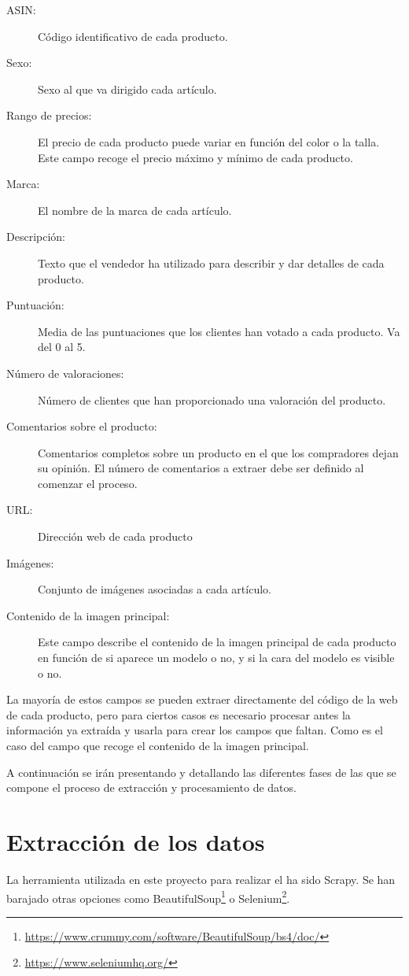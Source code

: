 \begin{description}
    \item[ASIN:] Código identificativo de cada producto.
    \item[Sexo:] Sexo al que va dirigido cada artículo.
    \item[Rango de precios:] El precio de cada producto puede variar en función del color o la talla. Este campo recoge el precio máximo y mínimo de cada producto.
    \item[Marca:] El nombre de la marca de cada artículo.
    \item[Descripción:] Texto que el vendedor ha utilizado para describir y dar detalles de cada producto.
    \item[Puntuación:] Media de las puntuaciones que los clientes han votado a cada producto. Va del 0 al 5.
    \item[Número de valoraciones:] Número de clientes que han proporcionado una valoración del producto.
    \item[Comentarios sobre el producto:] Comentarios completos sobre un producto en el que los compradores dejan su opinión. El número de comentarios a extraer debe ser definido al comenzar el proceso.
    \item[URL:] Dirección web de cada producto
    \item[Imágenes:] Conjunto de imágenes asociadas a cada artículo.
    \item[Contenido de la imagen principal:] Este campo describe el contenido de la imagen principal de cada producto en función de si aparece un modelo o no, y si la cara del modelo es visible o no.
\end{description}

La mayoría de estos campos se pueden extraer directamente del código  de la web de cada producto, pero para ciertos casos es necesario procesar antes la información ya extraída y usarla para crear los campos que faltan. Como es el caso del campo que recoge el contenido de la imagen principal.

A continuación se irán presentando y detallando las diferentes fases de las que se compone el proceso de extracción y procesamiento de datos.

\section{Extracción de los datos}

La herramienta utilizada en este proyecto para realizar el  ha sido Scrapy. Se han barajado otras opciones como BeautifulSoup\footnote{\url{https://www.crummy.com/software/BeautifulSoup/bs4/doc/}} o Selenium\footnote{\url{https://www.seleniumhq.org/}}.

